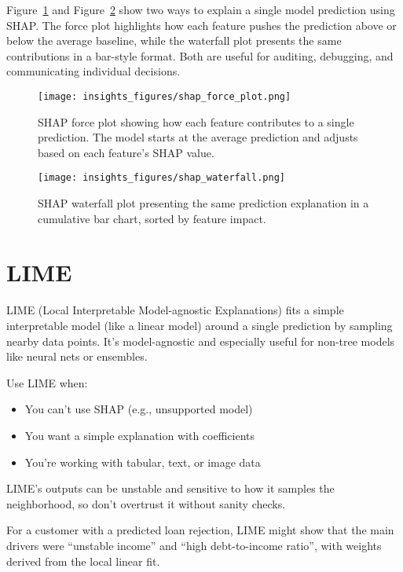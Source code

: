 \documentclass[12pt,openany]{book}
\begin{document}
Figure~\ref{fig:shap-force} and Figure~\ref{fig:shap-waterfall} show two ways to explain a single model prediction using SHAP. The force plot highlights how each feature pushes the prediction above or below the average baseline, while the waterfall plot presents the same contributions in a bar-style format. Both are useful for auditing, debugging, and communicating individual decisions.

\begin{figure}[H]
    \centering
    \texttt{[image: insights\_figures/shap\_force\_plot.png]}
    \caption{SHAP force plot showing how each feature contributes to a single prediction. The model starts at the average prediction and adjusts based on each feature’s SHAP value.}
    \label{fig:shap-force}
\end{figure}

\begin{figure}[H]
    \centering
    \texttt{[image: insights\_figures/shap\_waterfall.png]}
    \caption{SHAP waterfall plot presenting the same prediction explanation in a cumulative bar chart, sorted by feature impact.}
    \label{fig:shap-waterfall}
\end{figure}



\section{LIME}

LIME (Local Interpretable Model-agnostic Explanations) fits a simple interpretable model (like a linear model) around a single prediction by sampling nearby data points. It’s model-agnostic and especially useful for non-tree models like neural nets or ensembles.

Use LIME when:
\begin{itemize}
  \item You can’t use SHAP (e.g., unsupported model)
  \item You want a simple explanation with coefficients
  \item You’re working with tabular, text, or image data
\end{itemize}

\begin{notebox}
LIME’s outputs can be unstable and sensitive to how it samples the neighborhood, so don’t overtrust it without sanity checks.
\end{notebox}

\begin{examplebox}
For a customer with a predicted loan rejection, LIME might show that the main drivers were ``unstable income'' and ``high debt-to-income ratio'', with weights derived from the local linear fit.
\end{examplebox}
\end{document}
